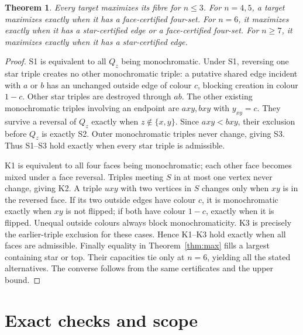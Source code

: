 \documentclass[a4paper,10pt]{amsart}
\newtheorem{theorem}{Theorem}[section]
\theoremstyle{remark}
\begin{document}
\begin{theorem}\label{thm:equality}
Every target maximizes its fibre for $n\le3$. For $n=4,5$, a target
maximizes exactly when it has a face-certified four-set. For $n=6$, it
maximizes exactly when it has a star-certified edge or a face-certified
four-set. For $n\ge7$, it maximizes exactly when it has a star-certified edge.
\end{theorem}
\begin{proof}
S1 is equivalent to all $Q_z$ being monochromatic. Under S1, reversing
one star triple creates no other monochromatic triple: a putative shared
edge incident with $a$ or $b$ has an unchanged outside edge of colour
$c$, blocking creation in colour $1-c$. Other star triples are destroyed
through $ab$. The other existing monochromatic triples involving an
endpoint are $axy,bxy$ with $y_{xy}=c$. They survive a reversal of $Q_z$
exactly when $z\notin\{x,y\}$. Since $axy<bxy$, their exclusion before
$Q_z$ is exactly S2. Outer monochromatic triples never change, giving S3.
Thus S1--S3 hold exactly when every star triple is admissible.

K1 is equivalent to all four faces being monochromatic; each other face
becomes mixed under a face reversal. Triples meeting $S$ in at most one
vertex never change, giving K2. A triple $uxy$ with two vertices in $S$
changes only when $xy$ is in the reversed face. If its two outside edges
have colour $c$, it is monochromatic exactly when $xy$ is not flipped;
if both have colour $1-c$, exactly when it is flipped. Unequal outside
colours always block monochromaticity. K3 is precisely the earlier-triple
exclusion for these cases. Hence K1--K3 hold exactly when all faces are
admissible. Finally equality in Theorem~\ref{thm:max} fills a largest
containing star or top. Their capacities tie only at $n=6$, yielding all
the stated alternatives. The converse follows from the same certificates
and the upper bound.
\end{proof}

\section{Exact checks and scope}
\end{document}
